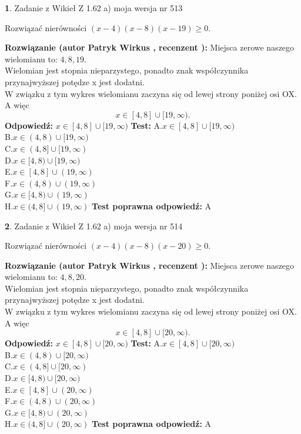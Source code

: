 \documentclass[12pt, a4paper]{article}
\theoremstyle{definition} %
\newtheorem{zad}{}
\newcommand{\zadStart}[1]{\begin{zad}#1\newline}
\newcommand{\zadStop}{\end{zad}}
\newcommand{\rozwStart}[2]{\noindent \textbf{Rozwiązanie (autor #1 , recenzent #2): }\newline}
\newcommand{\rozwStop}{\newline}
\newcommand{\odpStart}{\noindent \textbf{Odpowiedź:}\newline}
\newcommand{\odpStop}{\newline}
\newcommand{\testStart}{\noindent \textbf{Test:}\newline}
\newcommand{\testStop}{\newline}
\newcommand{\kluczStart}{\noindent \textbf{Test poprawna odpowiedź:}\newline}
\newcommand{\kluczStop}{\newline}
\begin{document}
\zadStart{Zadanie z Wikieł Z 1.62 a) moja wersja nr 513}

Rozwiązać nierówności $(x-4)(x-8)(x-19)\ge0$.
\zadStop
\rozwStart{Patryk Wirkus}{}
Miejsca zerowe naszego wielomianu to: $4, 8, 19$.\\
Wielomian jest stopnia nieparzystego, ponadto znak współczynnika przy\linebreak najwyższej potędze x jest dodatni.\\ W związku z tym wykres wielomianu zaczyna się od lewej strony poniżej osi OX. A więc $$x \in [4,8] \cup [19,\infty).$$
\rozwStop
\odpStart
$x \in [4,8] \cup [19,\infty)$
\odpStop
\testStart
A.$x \in [4,8] \cup [19,\infty)$\\
B.$x \in (4,8) \cup [19,\infty)$\\
C.$x \in (4,8] \cup [19,\infty)$\\
D.$x \in [4,8) \cup [19,\infty)$\\
E.$x \in [4,8] \cup (19,\infty)$\\
F.$x \in (4,8) \cup (19,\infty)$\\
G.$x \in [4,8) \cup (19,\infty)$\\
H.$x \in (4,8] \cup (19,\infty)$
\testStop
\kluczStart
A
\kluczStop



\zadStart{Zadanie z Wikieł Z 1.62 a) moja wersja nr 514}

Rozwiązać nierówności $(x-4)(x-8)(x-20)\ge0$.
\zadStop
\rozwStart{Patryk Wirkus}{}
Miejsca zerowe naszego wielomianu to: $4, 8, 20$.\\
Wielomian jest stopnia nieparzystego, ponadto znak współczynnika przy\linebreak najwyższej potędze x jest dodatni.\\ W związku z tym wykres wielomianu zaczyna się od lewej strony poniżej osi OX. A więc $$x \in [4,8] \cup [20,\infty).$$
\rozwStop
\odpStart
$x \in [4,8] \cup [20,\infty)$
\odpStop
\testStart
A.$x \in [4,8] \cup [20,\infty)$\\
B.$x \in (4,8) \cup [20,\infty)$\\
C.$x \in (4,8] \cup [20,\infty)$\\
D.$x \in [4,8) \cup [20,\infty)$\\
E.$x \in [4,8] \cup (20,\infty)$\\
F.$x \in (4,8) \cup (20,\infty)$\\
G.$x \in [4,8) \cup (20,\infty)$\\
H.$x \in (4,8] \cup (20,\infty)$
\testStop
\kluczStart
A
\kluczStop
\end{document}
